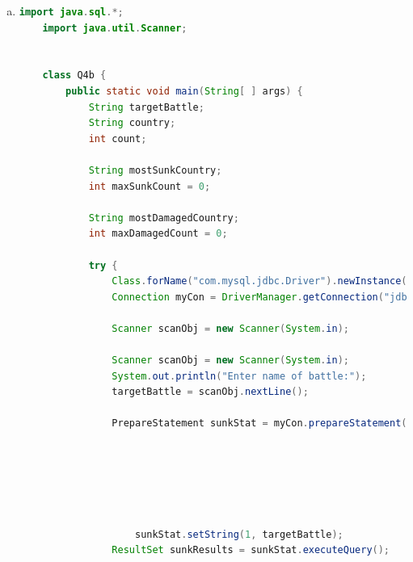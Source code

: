 \documentclass[12pt]{article}
\begin{document}
\begin{enumerate}[1.]
\begin{enumerate}[a)]
\begin{mdframed}
\begin{lstlisting}[language=JAVA]
                        while (results.next()) {
                            class = results.getString(1);
                            System.out.println(String.format("Class = %s\n", class));
                        }


                    } catch (SQLException ex) {
                        // handle the error
                        System.out.println("Error occured while establishing database connection");
                    }
                }
            }
            \end{lstlisting}

        \end{mdframed}

        \item

    \begin{lstlisting}[language=JAVA]
    import java.sql.*;
    import java.util.Scanner;


    class Q4b {
        public static void main(String[ ] args) {
            String targetBattle;
            String country;
            int count;

            String mostSunkCountry;
            int maxSunkCount = 0;

            String mostDamagedCountry;
            int maxDamagedCount = 0;

            try {
                Class.forName("com.mysql.jdbc.Driver").newInstance();
                Connection myCon = DriverManager.getConnection("jdbc:mysql://localhost/Q4"); // <- Corrected

                Scanner scanObj = new Scanner(System.in);

                Scanner scanObj = new Scanner(System.in);
                System.out.println("Enter name of battle:");
                targetBattle = scanObj.nextLine();

                PrepareStatement sunkStat = myCon.prepareStatement("SELECT country, COUNT(Outcomes.result) FROM Classes " +
                                                                   "INNER JOIN Ships ON Classes.class = Ships.class " +
                                                                   "INNER JOIN Outcomes ON Ships.name = Outcomes.ship " +
                                                                   "INNER JOIN Battles ON Battles.name = Outcome.battle " +
                                                                   "GROUP BY country " +
                                                                   "HAVING Battles.name= ? AND " +
                                                                   "Outcomes.result='sunk'");
                    sunkStat.setString(1, targetBattle);
                ResultSet sunkResults = sunkStat.executeQuery();


\end{lstlisting}
\end{enumerate}
\end{enumerate}
\end{document}

